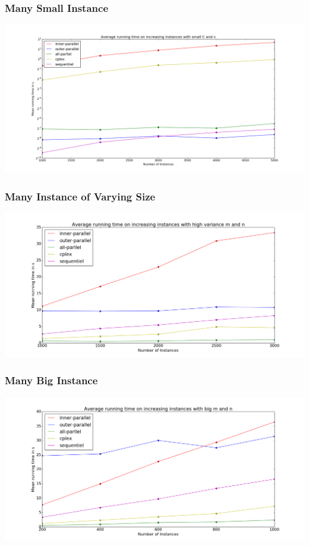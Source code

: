 \documentclass[handout]{beamer}
\begin{document}
\begin{frame}[fragile]
\frametitle{Many Small Instance}
\includegraphics[width=\textwidth]{../Doc/figures/many-small}
\end{frame}

\begin{frame}[fragile]
\frametitle{Many Instance of Varying Size}
\includegraphics[width=\textwidth]{../Doc/figures/many-varying}
\end{frame}

\begin{frame}[fragile]
\frametitle{Many Big Instance}
\includegraphics[width=\textwidth]{../Doc/figures/many-big}
\end{frame}
\end{document}

